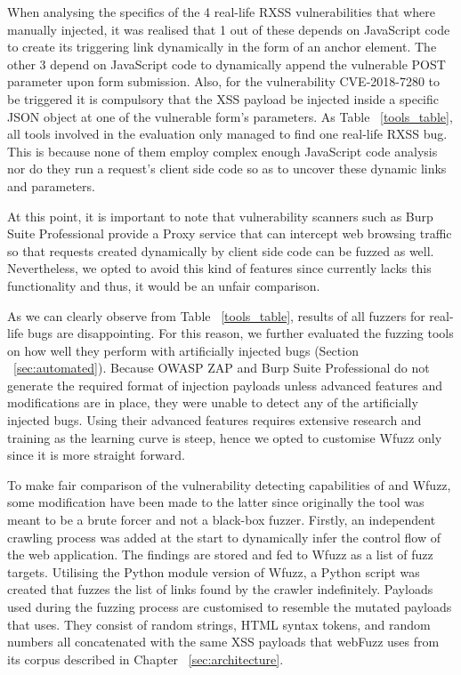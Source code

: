 When analysing the specifics of the 4 real-life RXSS vulnerabilities that where manually injected, it was realised that 1 out of these depends on JavaScript code to create its triggering link dynamically in the form of an anchor element. The other 3 depend on JavaScript code to dynamically append the vulnerable POST parameter upon form submission. Also, for the vulnerability CVE-2018-7280 to be triggered it is compulsory that the XSS payload be injected inside a specific JSON object at one of the vulnerable form's parameters. As Table ~\ref{tools_table}, all tools involved in the evaluation only managed to find one real-life RXSS bug. This is because none of them employ complex enough JavaScript code analysis nor do they run a request's client side code so as to uncover these dynamic links and parameters.

At this point, it is important to note that vulnerability scanners such as Burp Suite Professional provide a Proxy service that can intercept web browsing traffic so that requests created dynamically by client side code can be fuzzed as well. Nevertheless, we opted to avoid this kind of features since \pname{} currently lacks this functionality and thus, it would be an unfair comparison.

As we can clearly observe from Table ~\ref{tools_table}, results of all fuzzers for real-life bugs are disappointing. For this reason, we further evaluated the fuzzing tools on how well they perform with artificially injected bugs (Section ~\ref{sec:automated}). Because OWASP ZAP and Burp Suite Professional do not generate the required format of injection payloads unless advanced features and modifications are in place, they were unable to detect any of the artificially injected bugs. Using their advanced features requires extensive research and training as the learning curve is steep, hence we opted to customise Wfuzz only since it is more straight forward.

To make fair comparison of the vulnerability detecting capabilities of \pname{} and Wfuzz, some modification have been made to the latter since originally the tool was meant to be a brute forcer and not a black-box fuzzer. Firstly, an independent crawling process was added at the start to dynamically infer the control flow of the web application. The findings are stored and fed to Wfuzz as a list of fuzz targets. Utilising the Python module version of Wfuzz, a Python script was created that fuzzes the list of links found by the crawler indefinitely. Payloads used during the fuzzing process are customised to resemble the mutated payloads that \pname{} uses. They consist of random strings, HTML syntax tokens, and random numbers all concatenated with the same XSS payloads that webFuzz uses from its corpus described in Chapter ~\ref{sec:architecture}.

